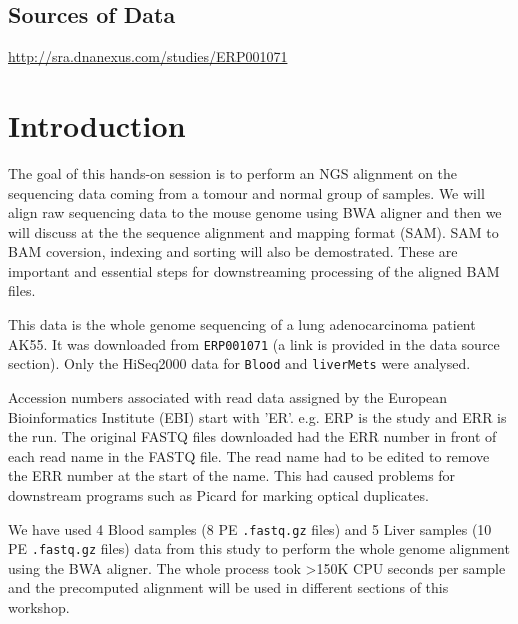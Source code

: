 \subsection{Sources of Data}
  \url{http://sra.dnanexus.com/studies/ERP001071}

\clearpage

\section{Introduction}

\begin{information}
The goal of this hands-on session is to perform an NGS alignment on the sequencing data coming from a tomour and normal group of samples. We will align raw sequencing data to the mouse genome using BWA aligner and then we will discuss at the the sequence alignment and mapping format (SAM). SAM to BAM coversion, indexing and sorting will also be demostrated. These are important and essential steps for downstreaming processing of the aligned BAM files. 
 
This data is the whole genome sequencing of a lung adenocarcinoma patient AK55. It was downloaded from \texttt{ERP001071} (a link is provided in the data source section). Only the HiSeq2000 data for \texttt{Blood} and \texttt{liverMets} were analysed.
\end{information}

\begin{note}
Accession numbers associated with read data assigned by the European Bioinformatics Institute (EBI) start with 'ER'. e.g. ERP is the study and ERR is the run. The original FASTQ files downloaded had the ERR number in front of each read name in the FASTQ file. The read name had to be edited to remove the ERR number at the start of the name. This had caused problems for downstream programs such as Picard for marking optical duplicates.
\end{note}

\begin{information}
We have used 4 Blood samples (8 PE \texttt{.fastq.gz} files) and 5 Liver samples (10 PE \texttt{.fastq.gz} files) data from this study to perform the whole genome alignment using the BWA aligner. The whole process took \textgreater150K CPU seconds per sample and the precomputed alignment will be used in different sections of this workshop. 
\end{information}

